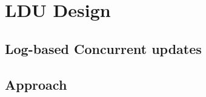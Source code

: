 \section{LDU Design}



\subsection{Log-based Concurrent updates}



\subsection{Approach}





















